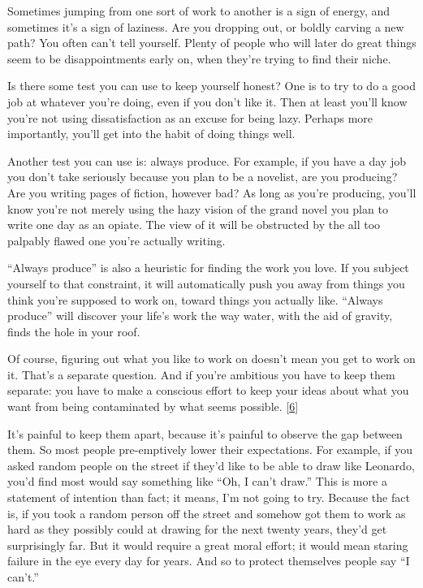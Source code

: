 Sometimes jumping from one sort of work to another is a sign of energy,
and sometimes it's a sign of laziness. Are you dropping out, or boldly
carving a new path? You often can't tell yourself. Plenty of people who
will later do great things seem to be disappointments early on, when
they're trying to find their niche.

Is there some test you can use to keep yourself honest? One is to try to
do a good job at whatever you're doing, even if you don't like it. Then
at least you'll know you're not using dissatisfaction as an excuse for
being lazy. Perhaps more importantly, you'll get into the habit of doing
things well.

Another test you can use is: always produce. For example, if you have a
day job you don't take seriously because you plan to be a novelist, are
you producing? Are you writing pages of fiction, however bad? As long as
you're producing, you'll know you're not merely using the hazy vision of
the grand novel you plan to write one day as an opiate. The view of it
will be obstructed by the all too palpably flawed one you're actually
writing.

``Always produce'' is also a heuristic for finding the work you love. If
you subject yourself to that constraint, it will automatically push you
away from things you think you're supposed to work on, toward things you
actually like. ``Always produce'' will discover your life's work the way
water, with the aid of gravity, finds the hole in your roof.

Of course, figuring out what you like to work on doesn't mean you get to
work on it. That's a separate question. And if you're ambitious you have
to keep them separate: you have to make a conscious effort to keep your
ideas about what you want from being contaminated by what seems
possible. {[}\hyperref[f6n]{6}{]}

It's painful to keep them apart, because it's painful to observe the gap
between them. So most people pre-emptively lower their expectations. For
example, if you asked random people on the street if they'd like to be
able to draw like Leonardo, you'd find most would say something like
``Oh, I can't draw.'' This is more a statement of intention than fact;
it means, I'm not going to try. Because the fact is, if you took a
random person off the street and somehow got them to work as hard as
they possibly could at drawing for the next twenty years, they'd get
surprisingly far. But it would require a great moral effort; it would
mean staring failure in the eye every day for years. And so to protect
themselves people say ``I can't.''

